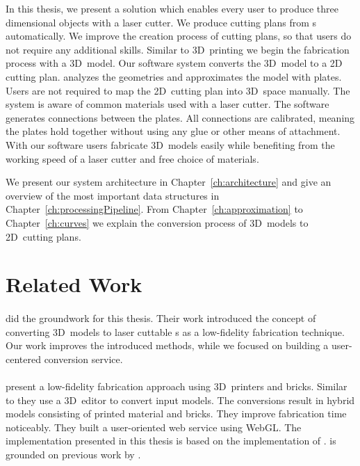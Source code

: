 \documentclass[../ClassicThesis.tex]{subfiles}
\begin{document}
In this thesis, we present a solution which enables every
user to produce three dimensional objects with a laser
cutter. We produce cutting plans from {\threedmodel}s
automatically. We improve the creation process of cutting
plans, so that users do not require any additional skills.
Similar to 3D~printing we begin the fabrication process with
a 3D~model.
Our software system {\platener} converts the 3D~model to a
2D cutting plan. {\platener} analyzes the geometries and
approximates the model with plates. Users are not required
to map the 2D~cutting plan into 3D~space manually. The
system is aware of common materials used with a laser
cutter. The software generates connections between the
plates. All connections are calibrated, meaning the plates
hold together without using any glue or other means of
attachment. With our software users fabricate 3D~models
easily while benefiting from the working speed of a laser
cutter and free choice of materials.



We present our system architecture in
Chapter~\ref{ch:architecture} and give an overview of the
most important data structures in
Chapter~\ref{ch:processingPipeline}. From
Chapter~\ref{ch:approximation} to Chapter~\ref{ch:curves} we
explain the conversion process of 3D~models to 2D~cutting
plans.

\section{Related Work}
\label{sec:related-work}

\paragraph{{\platener}} \citeauthor{master-thesis} did the groundwork
for this thesis. Their work introduced the concept of converting
3D~models to laser cuttable {\svgfile}s as a low-fidelity fabrication
technique. Our work improves the introduced methods, while we focused
on building a user-centered conversion service.

\paragraph{{\brickify}} \citeauthor{bachelor-thesis} present
a low-fidelity fabrication approach using 3D~printers and
{\lego} bricks. Similar to {\platener} they
use a 3D~editor to convert input models. The conversions
result in hybrid models consisting of printed material and
bricks. They improve fabrication time noticeably. They built
a user-oriented web service using WebGL. The implementation
presented in this thesis is based on the implementation of
{\brickify}. {\brickify} is grounded on previous work by
\citeauthor{fabrickation}.
\end{document}
